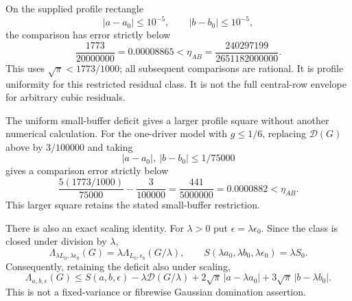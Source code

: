On the supplied profile rectangle
\[
 |a-a_0|\le10^{-5},\qquad |b-b_0|\le10^{-5},
\]
the comparison has error strictly below
\[
 \boxed{\frac{1773}{20000000}=0.00008865
 <\eta_{AB}=\frac{240297199}{2651182000000}.}
\]
This uses $\sqrt\pi<1773/1000$; all subsequent comparisons are rational.
It is profile uniformity for this restricted residual class.
It is not the full central-row envelope for arbitrary cubic residuals.

The uniform small-buffer deficit gives a larger profile square without
another numerical calculation. For the one-driver model with
$g\le1/6$, replacing $\mathcal D(G)$ above by $3/100000$ and taking
\[
 |a-a_0|,\ |b-b_0|\le1/75000
\]
gives a comparison error strictly below
\[
 \frac{5(1773/1000)}{75000}-\frac3{100000}
 =\frac{441}{5000000}=0.0000882<\eta_{AB}.
\]
This larger square retains the stated small-buffer restriction.

There is also an exact scaling identity. For $\lambda>0$ put
$\epsilon=\lambda\epsilon_0$. Since the class is closed under division
by $\lambda$,
\[
 \Lambda_{\lambda L_0,\lambda\epsilon_0}(G)
 =\lambda\Lambda_{L_0,\epsilon_0}(G/\lambda),\qquad
 S(\lambda a_0,\lambda b_0,\lambda\epsilon_0)=\lambda S_0 .
\]
Consequently, retaining the deficit also under scaling,
\[
 \boxed{\Lambda_{a,b,\epsilon}(G)\le S(a,b,\epsilon)
   -\lambda\mathcal D(G/\lambda)+2\sqrt\pi\,|a-\lambda a_0|
   +3\sqrt\pi\,|b-\lambda b_0|.}
\]
This is not a fixed-variance or fibrewise Gaussian domination assertion.
